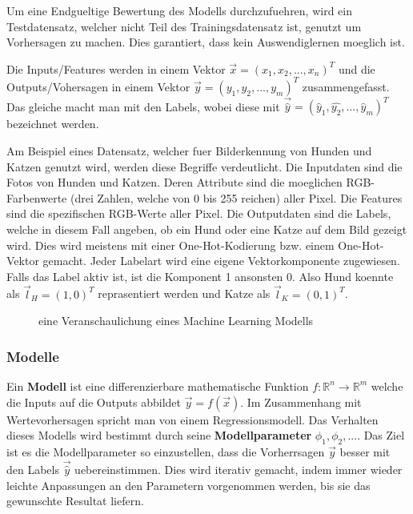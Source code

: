 \documentclass[../main]{subfiles}
\begin{document}
Um eine Endgueltige Bewertung des Modells durchzufuehren, wird ein Testdatensatz, welcher nicht Teil des Trainingsdatensatz ist, genutzt um Vorhersagen zu machen.
Dies garantiert, dass kein Auswendiglernen moeglich ist.

Die Inputs/Features werden in einem Vektor $\vec{x}=(x_1,x_2,...,x_n)^T$ und die Outputs/Vohersagen in einem Vektor $\vec{y}=(y_1,y_2,...,y_m)^T$ zusammengefasst.
Das gleiche macht man mit den Labels, wobei diese mit $\vec{\hat{y}}=(\hat{y}_1,\hat{y_2},...,\hat{y}_m)^T$ bezeichnet werden.
\par \medskip
Am Beispiel eines Datensatz, welcher fuer Bilderkennung von Hunden und Katzen genutzt wird, werden diese Begriffe verdeutlicht.
Die Inputdaten sind die Fotos von Hunden und Katzen. Deren Attribute sind die moeglichen RGB-Farbenwerte (drei Zahlen, welche von 0 bis 255 reichen) aller Pixel.
Die Features sind die spezifischen RGB-Werte aller Pixel. Die Outputdaten sind die Labels, welche in diesem Fall angeben, ob ein Hund oder eine Katze auf dem Bild gezeigt wird.
Dies wird meistens mit einer One-Hot-Kodierung bzw. einem One-Hot-Vektor gemacht. Jeder Labelart wird eine eigene Vektorkomponente zugewiesen. Falls das Label aktiv ist, ist die Komponent 1 ansonsten 0. Also Hund koennte als $\vec{l}_H=(1,0)^T$ reprasentiert werden und Katze als $\vec{l}_K=(0,1)^T$.

\begin{figure}[h!]
    \centering
    \begin{tikzpicture}[node distance=5cm,auto]
        
    \end{tikzpicture}
    
    \caption{eine Veranschaulichung eines Machine Learning Modells}
\end{figure}

\subsubsection{Modelle}
Ein \textbf{Modell} ist eine differenzierbare mathematische Funktion $\mathit{f}\colon \mathbb{R}^n \to \mathbb{R}^m$ welche die Inputs auf die Outputs abbildet $\vec{y}=\mathit{f}(\vec{x})$.
Im Zusammenhang mit Wertevorhersagen spricht man von einem Regressionsmodell.
Das Verhalten dieses Modells wird bestimmt durch seine \textbf{Modellparameter} $\phi_1, \phi_2, ...$.
Das Ziel ist es die Modellparameter so einzustellen, dass die Vorherrsagen $\vec{y}$ besser mit den Labels $\vec{\hat{y}}$ uebereinstimmen.
Dies wird iterativ gemacht, indem immer wieder leichte Anpassungen an den Parametern vorgenommen werden, bis sie das gewunschte Resultat liefern. 
\end{document}
